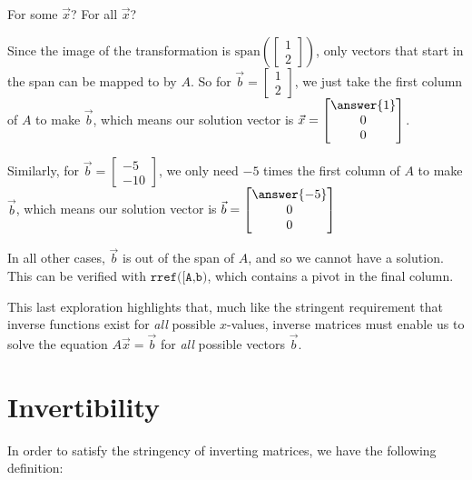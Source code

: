 \documentclass{ximera}
\begin{document}
\begin{exploration}{For some $\vec{x}$? For all $\vec{x}$?}
\begin{selectAll}
  \end{selectAll}

  \begin{feedback}
  
    Since the image of the transformation is $\mbox{span}\left(\begin{bmatrix}1\\2\end{bmatrix}\right)$, only vectors that start in the span can be mapped to by $A$. So for $\vec{b}=\begin{bmatrix}
    1\\2
    \end{bmatrix}$, we just take the first column of $A$ to make $\vec{b}$, which means our solution vector is $\vec{x}=\begin{bmatrix}
      \answer{1}\\0\\0
    \end{bmatrix}$. 

    Similarly, for $\vec{b}=\begin{bmatrix}
      -5\\-10
    \end{bmatrix}$, we only need $-5$ times the first column of $A$ to make $\vec{b}$, which means our solution vector is $\vec{b}=\begin{bmatrix}
      \answer{-5}\\0\\0
    \end{bmatrix}$

    In all other cases, $\vec{b}$ is out of the span of $A$, and so we cannot have a solution. This can be verified with $\texttt{rref([A,b)}$, which contains a pivot in the final column.

  \end{feedback}

\end{exploration}

This last exploration highlights that, much like the stringent requirement that inverse functions exist for \emph{all} possible $x$-values, inverse matrices must enable us to solve the equation $A\vec{x}=\vec{b}$ for \emph{all} possible vectors $\vec{b}$.

\section*{Invertibility}

In order to satisfy the stringency of inverting matrices, we have the following definition:
\end{document}
